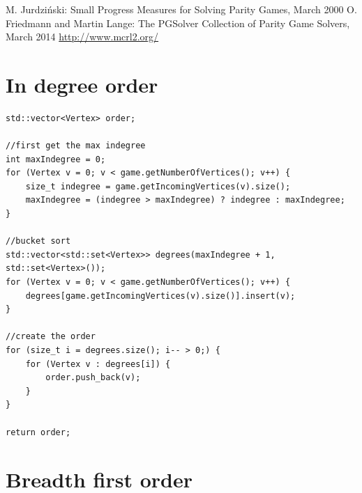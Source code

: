 \documentclass[10pt,a4paper]{article}
\begin{document}
\begin{thebibliography}{9}
 M. Jurdzi\'{n}ski: Small Progress Measures for Solving Parity Games, March 2000
 O. Friedmann and Martin Lange: The PGSolver Collection of Parity Game Solvers, March 2014
 \url{http://www.mcrl2.org/}
\end{thebibliography}


\newpage
\appendix

\section{In degree order}\label{appendix:indegree}
\begin{verbatim}
std::vector<Vertex> order;

//first get the max indegree
int maxIndegree = 0;
for (Vertex v = 0; v < game.getNumberOfVertices(); v++) {
    size_t indegree = game.getIncomingVertices(v).size();
    maxIndegree = (indegree > maxIndegree) ? indegree : maxIndegree;
}

//bucket sort
std::vector<std::set<Vertex>> degrees(maxIndegree + 1, std::set<Vertex>());
for (Vertex v = 0; v < game.getNumberOfVertices(); v++) {
    degrees[game.getIncomingVertices(v).size()].insert(v);
}

//create the order
for (size_t i = degrees.size(); i-- > 0;) {
    for (Vertex v : degrees[i]) {
        order.push_back(v);
    }
}

return order;
\end{verbatim}

\newpage
\section{Breadth first order}\label{appendix:bfs}
\end{document}
